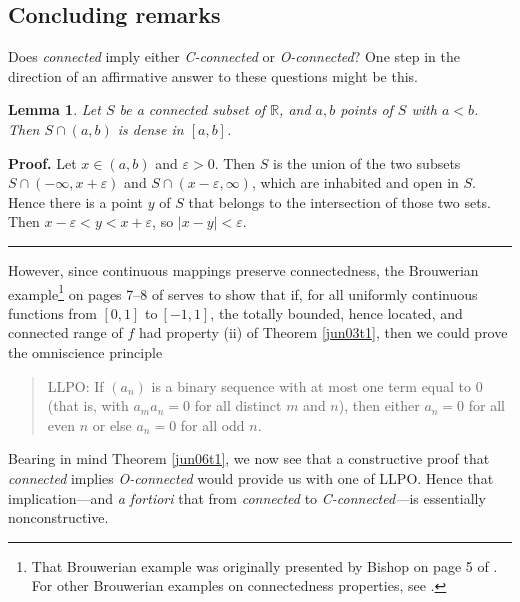 \documentclass[11pt]{article}%
\newtheorem{lemma}[theorem]{Lemma}
\newenvironment{proof}[1][Proof]{\noindent\textbf{#1.} }{\ \rule{0.5em}{0.5em}}
\begin{document}
\subsection{Concluding remarks}

Does \emph{connected} imply either \emph{C-connected} or \emph{O-connected}?
One step in the direction of an affirmative answer to these questions might be this.

\begin{lemma}
\label{jun03l1}Let $S$ be a connected subset of $\mathbb{R}$, and $a,b$ points
of $S$ with $a<b$. Then $S\cap\left(  a,b\right)  $ is dense in $\left[
a,b\right]  $.
\end{lemma}

\begin{proof}
Let $x\in\left(  a,b\right)  $ and $\varepsilon>0$. Then $S$ is the union of
the two subsets $S\cap(-\infty,x+\varepsilon)$ and $S\cap\left(
x-\varepsilon,\infty\right)  $, which are inhabited and open in $S$. Hence
there is a point $y$ of $S$ that belongs to the intersection of those two
sets. Then $x-\varepsilon<y<x+\varepsilon$, so $\left\vert x-y\right\vert
<\varepsilon$.
\end{proof}%

\medskip


However, since continuous mappings preserve connectedness, the Brouwerian
example\footnote{%
\normalfont\sf
That Brouwerian example was originally presented by Bishop on page 5 of
\cite{Bishop}. For other Brouwerian examples on connectedness properties, see
\cite{dsb,MarkM78}.} on pages 7--8 of \cite{BB} serves to show that if, for
all uniformly continuous functions from $\left[  0,1\right]  $ to$~\left[
-1,1\right]  $, the totally bounded, hence located, and connected range of $f$
had property (ii) of Theorem \ref{jun03t1}, then we could prove the
omniscience principle

\begin{quote}
LLPO: If $\left(  a_{n}\right)  $ is a binary sequence with at most one term
equal to $0$ (that is, with $a_{m}a_{n}=0$ for all distinct $m$ and $n$), then
either $a_{n}=0$ for all even $n$ or else $a_{n}=0$ for all odd $n$.
\end{quote}%

\noindent
Bearing in mind Theorem \ref{jun06t1}, we now see that a constructive proof
that \emph{connected} implies \emph{O-connected} would provide us with one of
LLPO. Hence that implication---and \emph{a fortiori }that from \emph{connected
}to \emph{C-connected---}is essentially nonconstructive.%
\end{document}
